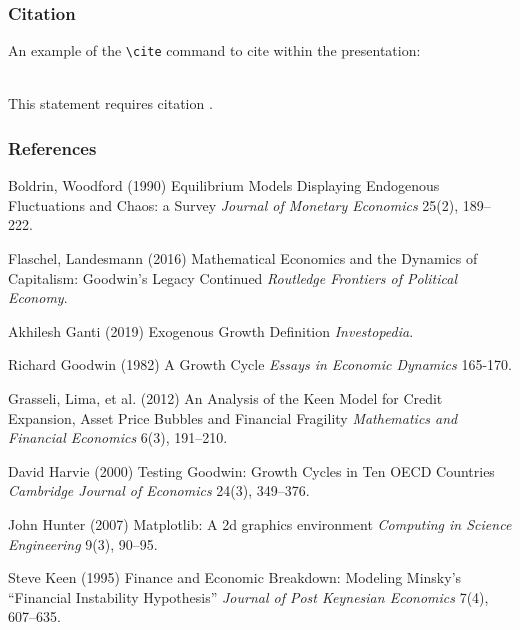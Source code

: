 \documentclass{beamer}
\begin{document}

\begin{frame}[fragile] %
\frametitle{Citation}
An example of the \verb|\cite| command to cite within the presentation:\\~

This statement requires citation \cite{p1}.
\end{frame}

\begin{frame}[allowframebreaks]
\frametitle{References}
\footnotesize{
\begin{thebibliography}{99} %
\begin{tiny}
 Boldrin, Woodford (1990)
\newblock Equilibrium Models Displaying Endogenous Fluctuations and Chaos:  a Survey
\newblock \emph{Journal of Monetary Economics} 25(2), 189–222.

 Flaschel, Landesmann (2016)
\newblock Mathematical Economics and the Dynamics of Capitalism: Goodwin’s Legacy Continued
\newblock \emph{Routledge Frontiers of Political Economy}.

 Akhilesh Ganti (2019)
\newblock Exogenous Growth Definition
\newblock \emph{Investopedia}.

 Richard Goodwin (1982)
\newblock A Growth Cycle
\newblock \emph{Essays in Economic Dynamics} 165-170.

 Grasseli, Lima, et al. (2012)
\newblock An Analysis of the Keen Model for Credit Expansion, Asset Price Bubbles and Financial Fragility
\newblock \emph{Mathematics and Financial Economics} 6(3), 191–210.

 David Harvie (2000)
\newblock Testing Goodwin: Growth Cycles in Ten OECD Countries
\newblock \emph{Cambridge Journal of Economics} 24(3), 349–376.

 John Hunter (2007)
\newblock Matplotlib:  A 2d graphics environment
\newblock \emph{Computing in Science Engineering} 9(3), 90–95.

 Steve Keen (1995)
\newblock Finance and Economic Breakdown:  Modeling Minsky’s “Financial Instability Hypothesis”
\newblock \emph{Journal of Post Keynesian Economics} 7(4), 607–635.


\end{tiny}
\end{thebibliography}}
\end{frame}
\end{document}
